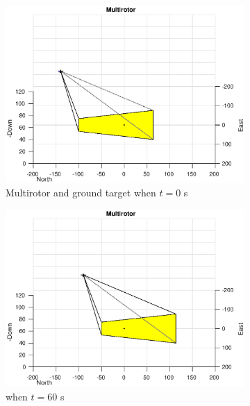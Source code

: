 \begin{figure}[htbp]
	\centering
	\begin{subfigure}[t]{0.45\linewidth}
		\includegraphics[width=\textwidth]{images/chapter4/inertial_UAV_0mps}
		\caption{Multirotor and ground target when $t=0$ s}
	\end{subfigure}
	\begin{subfigure}[t]{0.45\linewidth}
		\includegraphics[width=\textwidth]{images/chapter4/inertial_UAV_0mps_60s}
		\caption{when $t=60$ s}
	\end{subfigure}
	\begin{subfigure}[t]{0.45\linewidth}

\end{subfigure}
\end{figure}
